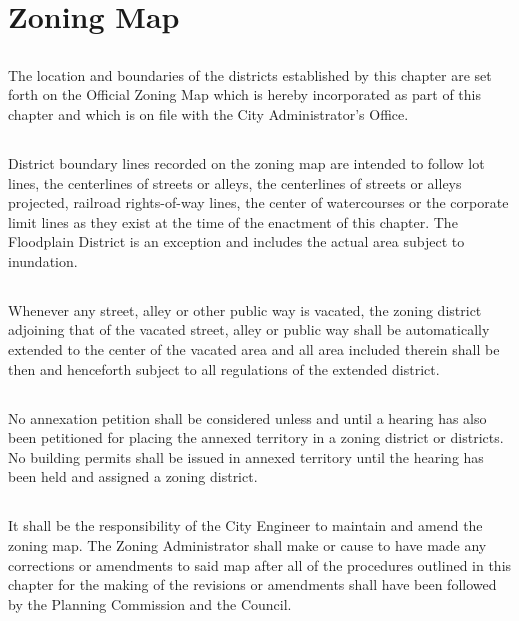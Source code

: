\section{Zoning Map}
\subsection{}
The location and boundaries of the districts established by this chapter are set forth on the Official Zoning Map which is hereby incorporated as part of this chapter and which is on file with the City Administrator’s Office.
\subsection{}
District boundary lines recorded on the zoning map are intended to follow lot lines, the centerlines of streets or alleys, the centerlines of streets or alleys projected, railroad rights-of-way lines, the center of watercourses or the corporate limit lines as they exist at the time of the enactment of this chapter.  The Floodplain District is an exception and includes the actual area subject to inundation.
\subsection{}
Whenever any street, alley or other public way is vacated, the zoning district adjoining that of the vacated street, alley or public way shall be automatically extended to the center of the vacated area and all area included therein shall be then and henceforth subject to all regulations of the extended district.
\subsection{}
No annexation petition shall be considered unless and until a hearing has also been petitioned for placing the annexed territory in a zoning district or districts.  No building permits shall be issued in annexed territory until the hearing has been held and assigned a zoning district.
\subsection{}
It shall be the responsibility of the City Engineer to maintain and amend the zoning map.  The Zoning Administrator shall make or cause to have made any corrections or amendments to said map after all of the procedures outlined in this chapter for the making of the revisions or amendments shall have been followed by the Planning Commission and the Council.
